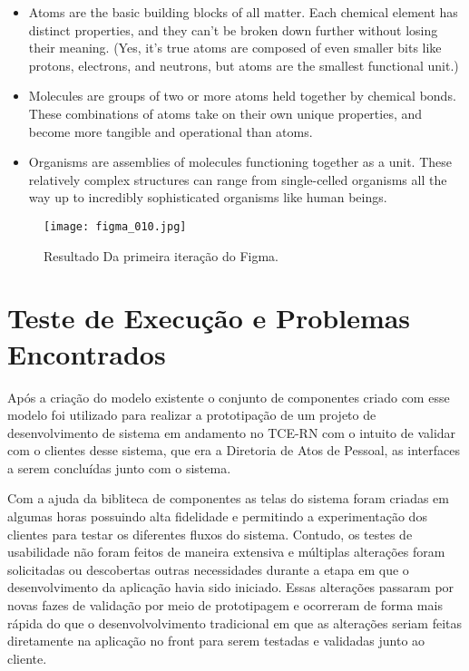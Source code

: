 \begin{citacao}[brazil]
	\begin{itemize}
		\item Atoms are the basic building blocks of all matter. Each chemical element has distinct properties, and they can’t be broken down further without losing their meaning. (Yes, it’s true atoms are composed of even smaller bits like protons, electrons, and neutrons, but atoms are the smallest functional unit.)
		\item Molecules are groups of two or more atoms held together by chemical bonds. These combinations of atoms take on their own unique properties, and become more tangible and operational than atoms.
		\item Organisms are assemblies of molecules functioning together as a unit. These relatively complex structures can range from single-celled organisms all the way up to incredibly sophisticated organisms like human beings.
	\end{itemize}
	\cite{atomic_design}
\end{citacao}

\begin{figure}[h!]
	\texttt{[image: figma\_010.jpg]}
	\caption{Resultado Da primeira iteração do Figma.}
	\label{fig:tcenglib}
\end{figure}

\section{Teste de Execução e Problemas Encontrados} \label{secao33}

Após a criação do modelo existente o conjunto de componentes criado com esse modelo foi utilizado para realizar a prototipação de um projeto de desenvolvimento de sistema em andamento no TCE-RN com o intuito de validar com o clientes desse sistema, que era a Diretoria de Atos de Pessoal, as interfaces a serem concluídas junto com o sistema.

Com a ajuda da bibliteca de componentes as telas do sistema foram criadas em algumas horas possuindo alta fidelidade e permitindo a experimentação dos clientes para testar os diferentes fluxos do sistema. Contudo, os testes de usabilidade não foram feitos de maneira extensiva e múltiplas alterações foram solicitadas ou descobertas outras necessidades durante a etapa em que o desenvolvimento da aplicação havia sido iniciado. Essas alterações passaram por novas fazes de validação por meio de prototipagem e ocorreram de forma mais rápida do que o desenvolvolvimento tradicional em que as alterações seriam feitas diretamente na aplicação no front para serem testadas e validadas junto ao cliente.

